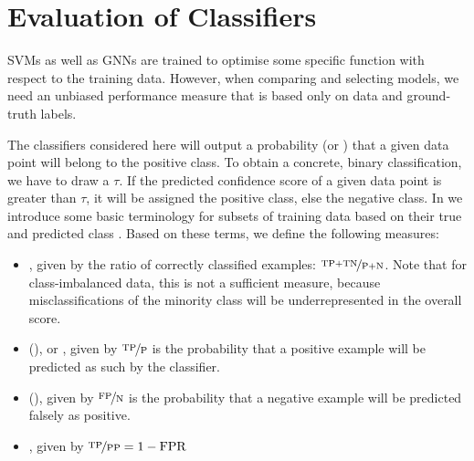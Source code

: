 \documentclass[
	fontsize=10pt, %
	twoside=true, %
	secnumdepth=1, %
  toc=indentunnumbered %
]{kaobook}
\begin{document}


\section{Evaluation of Classifiers}
\label{sec:evaluation-classifiers}

SVMs as well as GNNs are trained to optimise some specific function with respect
to the training data. However, when comparing and selecting models, we need an
unbiased performance measure that is based only on data and ground-truth labels.

The classifiers considered here will output a
probability (or ) that a given data point will belong to
the positive class. To obtain a concrete, binary classification, we have to draw
a  $\tau$. If the predicted confidence score of a given
data point is greater than $\tau$, it will be assigned the positive class, else
the negative class.
%
In  we introduce some basic terminology for subsets of
training data based on their true and predicted class
\cite{tharwat_ClassificationAssessmentMethods_2021}. Based on these terms, we
define the following measures:
\begin{itemize}
\item {}, given by the ratio of
  correctly classified examples: $\nicefrac{\TP{} + \TN{}}{\P{}+\N{}}$. Note that for
  class-imbalanced data, this is not a sufficient measure, because
  misclassifications of the minority class will be underrepresented in the
  overall score.
\item  {} (\TPR{}), or , given by $\nicefrac{\TP{}}{\P{}}$ is
  the probability that a positive example will be predicted as such by the classifier.
\item {} (\FPR{}), given by $\nicefrac{\FP{}}{\N{}}$ is the
  probability that a negative example will be predicted falsely as positive.
  \item {}, given by $\nicefrac{\TP{}}{\PP{}} = 1 - \FPR{}$
\end{itemize}
\end{document}

